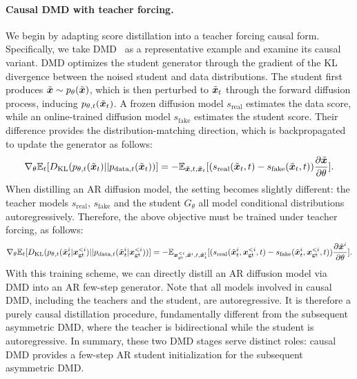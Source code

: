 \paragraph{Causal DMD with teacher forcing.} We begin by adapting score distillation into a teacher forcing causal form. Specifically, we take DMD~\cite{wang2023prolificdreamer,luo2023diff,yin2024one,yin2024improved} as a representative example and examine its causal variant. DMD optimizes the student generator through the gradient of the KL divergence between the noised student and data distributions. The student first produces $\tilde{{\bm{x}}}\sim p_\theta(\tilde{{\bm{x}}})$, which is then perturbed to $\tilde{{\bm{x}}}_t$ through the forward diffusion process, inducing $p_{\theta,t}(\tilde{{\bm{x}}}_t)$. A frozen diffusion model $s_{\text{real}}$ estimates the data score, while an online-trained diffusion model $s_{\text{fake}}$ estimates the student score. Their difference provides the distribution-matching direction, which is backpropagated to update the generator as follows:
\begin{align}
\label{eq:dmd}
\nabla_\theta\mathbb{E}_t[D_{\mathrm{KL}}(p_{\theta,t}(\tilde{{\bm{x}}}_t)||p_{\text{data},t}(\tilde{{\bm{x}}}_t))]
   = -\mathbb{E}_{\tilde{{\bm{x}}}, t, \tilde{{\bm{x}}}_t}[(s_\text{real}(\tilde{{\bm{x}}}_t,t)-s_\text{fake}(\tilde{{\bm{x}}}_t,t))\frac{\partial \tilde{{\bm{x}}}}{\partial \theta}].
\end{align}
When distilling an AR diffusion model, the setting becomes slightly different: the teacher models $s_\text{real}$, $s_\text{fake}$ and the student $G_\theta$ all model conditional distributions autoregressively. Therefore, the above objective must be trained under teacher forcing, as follows:
\begin{align}
\label{eq:causal-dmd}
\nabla_\theta\mathbb{E}_t[D_{\mathrm{KL}}(p_{\theta,t}(\tilde{{\bm{x}}}_t^i|{\bm{x}}_{\mathrm{gt}}^{<i})||p_{\text{data},t}(\tilde{{\bm{x}}}_t^i|{\bm{x}}_{\mathrm{gt}}^{<i}))]
   = -\mathbb{E}_{{\bm{x}}_{\mathrm{gt}}^{<i},\tilde{{\bm{x}}}^i, t, \tilde{{\bm{x}}}_t^i}[(s_\text{real}(\tilde{{\bm{x}}}_t^i,{\bm{x}}_{\mathrm{gt}}^{<i},t)-s_\text{fake}(\tilde{{\bm{x}}}_t^i,{\bm{x}}_{\mathrm{gt}}^{<i},t))\frac{\partial \tilde{{\bm{x}}}^i}{\partial \theta}].
\end{align}
With this training scheme, we can directly distill an AR diffusion model via DMD into an AR few-step generator. Note that all models involved in causal DMD, including the teachers and the student, are autoregressive. It is therefore a purely causal distillation procedure, fundamentally different from the subsequent asymmetric DMD, where the teacher is bidirectional while the student is autoregressive. In summary, these two DMD stages serve distinct roles: causal DMD provides a few-step AR student initialization for the subsequent asymmetric DMD.

